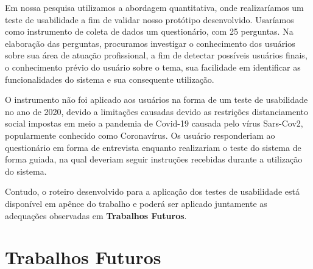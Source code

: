 
Em nossa pesquisa utilizamos a abordagem quantitativa, onde realizaríamos um teste de usabilidade a fim de validar nosso protótipo desenvolvido. Usaríamos como instrumento de coleta de dados um questionário, com 25 perguntas. Na elaboração das perguntas, procuramos investigar o conhecimento dos usuários sobre sua área de atuação profissional, a fim de detectar possíveis usuários finais, o conhecimento prévio do usuário sobre o tema, sua facilidade em identificar as funcionalidades do sistema e sua consequente utilização.

O instrumento não foi aplicado aos usuários na forma de um teste de usabilidade no ano de 2020, devido a limitações causadas devido as restrições distanciamento social impostas em meio a pandemia de Covid-19 causada pelo vírus Sars-Cov2, popularmente conhecido como Coronavírus.  Os usuário responderiam ao questionário em forma de entrevista enquanto realizariam o teste do sistema de forma guiada, na qual deveriam seguir instruções recebidas durante a utilização do sistema.

Contudo, o roteiro desenvolvido para a aplicação dos testes de usabilidade está disponível em apênce do trabalho e poderá ser aplicado juntamente as adequações observadas em \textbf{Trabalhos Futuros}.





 \section{Trabalhos Futuros}

